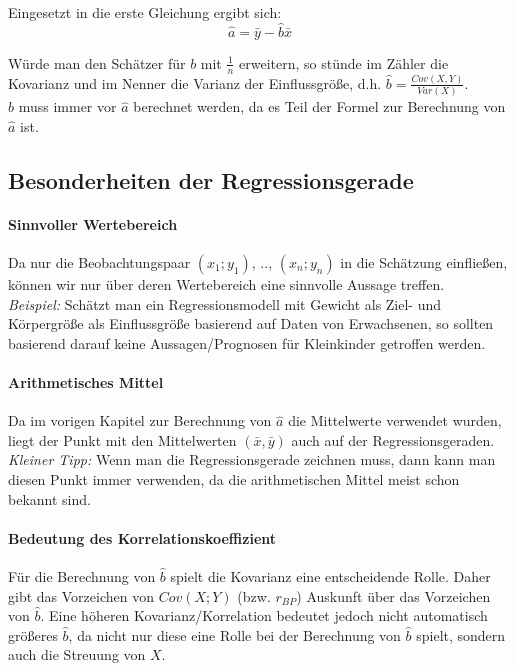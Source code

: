 \documentclass[a4paper]{article}
\newcommand\dangersign[1][2ex]{%
  \renewcommand\stacktype{L}%
  \scaleto{\stackon[1.3pt]{\color{red}$\triangle$}{\tiny !}}{#1}%
}
\begin{document}
\noindent Eingesetzt in die erste Gleichung ergibt sich:
$$\hat{a}=\bar{y}-\hat{b}\bar{x}$$

\noindent Würde man den Schätzer für $b$ mit $\frac{1}{n}$ erweitern, so stünde im Zähler die Kovarianz und im Nenner die Varianz der Einflussgröße, d.h. $\hat{b}=\frac{Cov(X,Y)}{Var(X)}$.\\

\noindent \dangersign[3ex] $\hat b$ muss immer vor $\hat a$ berechnet werden, da es Teil der Formel zur Berechnung von $\hat a$ ist.

\subsection{Besonderheiten der Regressionsgerade}\label{sec:obacht}
\paragraph{Sinnvoller Wertebereich} Da nur die Beobachtungspaar $(x_1;y_1)$, .., $(x_n;y_n)$ in die Schätzung einfließen, können wir nur über deren Wertebereich eine sinnvolle Aussage treffen.\\
\textit{Beispiel:} Schätzt man ein Regressionsmodell mit Gewicht als Ziel- und Körpergröße als Einflussgröße basierend auf Daten von Erwachsenen, so sollten basierend darauf keine Aussagen/Progno\-sen für Kleinkinder getroffen werden.

\paragraph{Arithmetisches Mittel} Da im vorigen Kapitel zur Berechnung von $\hat{a}$ die Mittelwerte verwendet wurden, liegt der Punkt mit den Mittelwerten $(\bar{x},\bar{y})$ auch auf der Regressionsgeraden.\\
\textit{Kleiner Tipp:} Wenn man die Regressionsgerade zeichnen muss, dann kann man diesen Punkt immer verwenden, da die arithmetischen Mittel meist schon bekannt sind.

\paragraph{Bedeutung des Korrelationskoeffizient} Für die Berechnung von $\hat{b}$ spielt die Kovarianz eine entscheidende Rolle. Daher gibt das Vorzeichen von $Cov(X;Y)$ (bzw. $r_{BP}$) Auskunft über das Vorzeichen von $\hat b$. Eine höheren Kovarianz/Korrelation bedeutet jedoch nicht automatisch größeres $\hat b$, da nicht nur diese eine Rolle bei der Berechnung von $\hat{b}$ spielt, sondern auch die Streuung von $X$.
\end{document}
